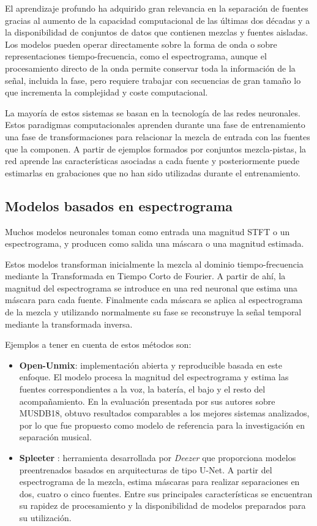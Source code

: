 El aprendizaje profundo ha adquirido gran relevancia en la separación de fuentes gracias al aumento de la capacidad computacional de las últimas dos décadas y a la disponibilidad de conjuntos de datos que contienen mezclas y fuentes aisladas. Los modelos pueden operar directamente sobre la forma de onda o sobre representaciones tiempo-frecuencia, como el espectrograma, aunque el procesamiento directo de la onda permite conservar toda la información de la señal, incluida la fase, pero requiere trabajar con secuencias de gran tamaño lo que incrementa la complejidad y coste computacional.

La mayoría de estos sistemas se basan en la tecnología de las redes neuronales. Estos paradigmas computacionales aprenden durante una fase de entrenamiento una fase de transformaciones para relacionar la mezcla de entrada con las fuentes que la componen. A partir de ejemplos formados por conjuntos mezcla-pistas, la red aprende las características asociadas a cada fuente y posteriormente puede estimarlas en grabaciones que no han sido utilizadas durante el entrenamiento.

\subsection{Modelos basados en espectrograma}

Muchos modelos neuronales toman como entrada una magnitud STFT o un espectrograma, y producen como salida una máscara o una magnitud estimada.

Estos modelos transforman inicialmente la mezcla al dominio tiempo-frecuencia mediante la Transformada en Tiempo Corto de Fourier. A partir de ahí, la magnitud del espectrograma se introduce en una red neuronal que estima una máscara para cada fuente. Finalmente cada máscara se aplica al espectrograma de la mezcla y utilizando normalmente su fase se reconstruye la señal temporal mediante la transformada inversa.


Ejemplos a tener en cuenta de estos métodos son:

\begin{itemize}
    \item \textbf{Open-Unmix}\cite{openunmix2019}: implementación abierta y reproducible basada en este enfoque. El modelo procesa la magnitud del espectrograma y estima las fuentes correspondientes a la voz, la batería, el bajo y el resto del acompañamiento. En la evaluación presentada por sus autores sobre MUSDB18, obtuvo resultados comparables a los mejores sistemas analizados, por lo que fue propuesto como modelo de referencia para la investigación en separación musical.
    \item \textbf{Spleeter} \cite{Deezer}: herramienta desarrollada por \textit{Deezer} que proporciona modelos preentrenados basados en arquitecturas de tipo U-Net. A partir del espectrograma de la mezcla, estima máscaras para realizar separaciones en dos, cuatro o cinco fuentes. Entre sus principales características se encuentran su rapidez de procesamiento y la disponibilidad de modelos preparados para su utilización.
\end{itemize}

